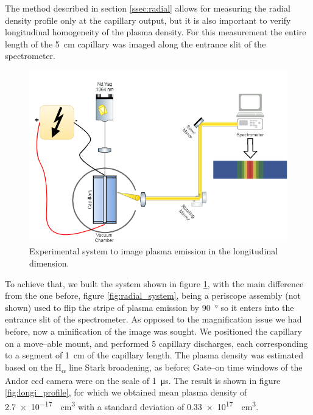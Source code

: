 \documentclass[../main.tex]{subfiles}
\begin{document}
The method described in section \ref{ssec:radial} allows for measuring the radial density profile only at the capillary output, but it is also important to verify longitudinal homogeneity of the plasma density. For this measurement the entire length of the \SI{5}{\cm} capillary was imaged along the entrance slit of the spectrometer.
\begin{figure}
    \centering
    \includegraphics[width=\textwidth]{figures/spectro/longitudinal_system.png}
    \caption{Experimental system to image plasma emission in the longitudinal dimension.}
    \label{fig:longi_system}
\end{figure}

To achieve that, we built the system shown in figure \ref{fig:longi_system}, with the main difference from the one before, figure \ref{fig:radial_system}, being a periscope assembly (not shown) used to flip the stripe of plasma emission by \SI{90}{\degree} so it enters into the entrance slit of the spectrometer. As opposed to the magnification issue we had before, now a minification of the image was sought. We positioned the capillary on a move--able mount, and performed 5 capillary discharges, each corresponding to a segment of \SI{1}{\cm} of the capillary length. The plasma density was estimated based on the H\textsubscript{$\alpha$} line Stark broadening, as before; Gate--on time windows of the Andor ccd camera were on the scale of \SI{1}{\us}. The result is shown in figure \ref{fig:longi_profile}, for which we obtained mean plasma density of \SI{2.7e-17}{\per\cubic\cm} with a standard deviation of \SI{0.33e17}{\per\cubic\cm}.
\end{document}
